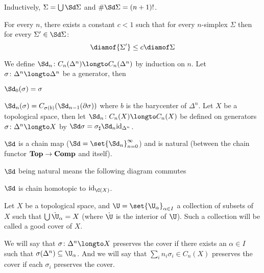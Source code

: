 \edefn

Inductively, $\Sigma=\bigcup\Sd\Sigma$ and $\#\Sd\Sigma=(n+1)!$.

\bthrm

    For every $n$, there exists a constant $c<1$ such that for every $n$-simplex $\Sigma$ then for every $\Sigma'\in\Sd\Sigma$:
    $$ \diamof{\Sigma'} \leq c\diamof\Sigma $$

\ethrm

\bdefn

    We define $\Sd_n\colon C_n(\Delta^n)\longto C_n(\Delta^n)$ by induction on $n$.
    Let $\sigma\colon\Delta^n\longto\Delta^n$ be a generator, then
    \benum
        \item $\Sd_0(\sigma)=\sigma$
        \item $\Sd_n(\sigma)=C_{\sigma(b)}(\Sd_{n-1}(\partial\sigma))$ where $b$ is the barycenter of $\Delta^n$.
    \eenum
    Let $X$ be a topological space, then let $\Sd_n\colon C_n(X)\longto C_n(X)$ be defined on generators $\sigma\colon\Delta^n\longto X$ by $\Sd\sigma=\sigma_\sharp\Sd_n{\rm id}_{\Delta^n}$.

\edefn

\bthrm

    $\Sd$ is a chain map ($\Sd=\set{\Sd_n}_{n=0}^\infty$) and is natural (between the chain functor ${\bf Top}\to{\bf Comp}$ and itself).

\ethrm

$\Sd$ being natural means the following diagram commutes

\bigskip
\centerline{\def\diagrowheight{1cm}}

\bthrm

    $\Sd$ is chain homotopic to ${\rm id}_{\C(X)}$.

\ethrm

\bdefn

    Let $X$ be a topological space, and $\U=\set{\U_\alpha}_{\alpha\in I}$ a collection of subsets of $X$ such that $\bigcup\Dot\U_\alpha=X$ (where $\Dot\U$ is the interior of $\U$).
    Such a collection will be called a {\emphcolor good cover} of $X$.

    We will say that $\sigma\colon\Delta^n\longto X$ {\emphcolor preserves} the cover if there exists an $\alpha\in I$ such that $\sigma(\Delta^n)\subseteq\U_\alpha$.
    And we will say that $\sum_in_i\sigma_i\in C_n(X)$ {\emphcolor preserves} the cover if each $\sigma_i$ preserves the cover.

